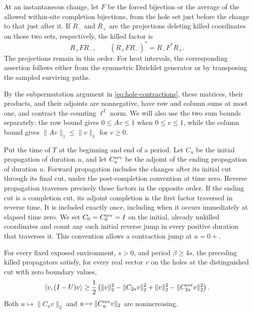 At an instantaneous change, let $F$ be the forced bijection or the
average of the allowed within-site completion bijections, from the
hole set just before the change to that just after it.  If $R_-$ and
$R_+$ are the projections deleting killed coordinates on those two
sets, respectively, the killed factor is
\begin{equation}\label{eq:ordered-killing}
             R_+FR_-,\qquad
             (R_+FR_-)^*=R_-F^*R_+.
\end{equation}
The projections remain in this order.  For heat intervals, the
corresponding assertion follows either from the symmetric Dirichlet
generator or by transposing the sampled surviving paths.

By the subpermutation argument in \eqref{eq:hole-contractions}, these
matrices, their products, and their adjoints are nonnegative, have row
and column sums at most one, and contract the counting $\ell^2$ norm.
We will also use the two sum bounds separately: the row bound gives
$0\le Av\le1$ when $0\le v\le1$, while the column bound gives
$\|Av\|_1\le\|v\|_1$ for $v\ge0$.

Put the time of $T$ at the beginning and end of a period.  Let $C_u$ be
the initial propagation of duration $u$, and let $C_u^{\rm rev}$ be
the adjoint of the ending propagation of duration $u$.
Forward propagation includes the changes after its initial cut through
its final cut, under the post-completion convention at time zero.
Reverse propagation traverses precisely those factors in the opposite
order.  If the ending cut is a completion cut, its adjoint completion
is the first factor traversed in reverse time.  It is included exactly
once, including when it occurs immediately at elapsed time zero.
We set $C_0=C_0^{\rm rev}=I$ on the initial, already unkilled
coordinates and count any such initial reverse jump in every positive
duration that traverses it.  This convention allows a contraction jump
at $u=0+$.

\begin{lemma}\label{lem:two-ends}
For every fixed exposed environment, $s>0$, and period $\beta\ge4s$,
the preceding killed propagators satisfy, for every real vector $v$
on the holes at the distinguished cut with zero boundary values,
\begin{equation}\label{eq:two-ends}
 \langle v,(I-U)v\rangle\ge\frac12\left(
   \|v\|_2^2-\|C_{2s}v\|_2^2
  +\|v\|_2^2-\|C_{2s}^{\rm rev}v\|_2^2\right).
\end{equation}
Both $u\mapsto\|C_uv\|_2$ and
$u\mapsto\|C_u^{\rm rev}v\|_2$ are nonincreasing.
\end{lemma}

